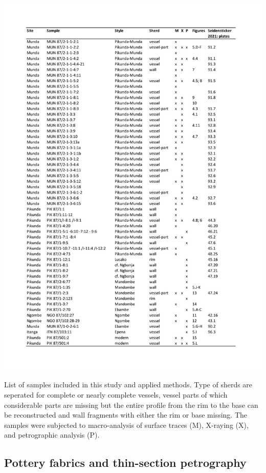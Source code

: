 \documentclass[smallextended,natbib]{svjour3}       %
\begin{document}
\begin{table}[p]
	\centering
	\includegraphics[height=.88\textheight]{Tab_Samples.pdf}
	\caption{List of samples included in this study and applied methods. Type of sherds are seperated for complete or nearly complete vessels, vessel parts of which considerable parts are missing but the entire profile from the rim to the base can be reconstructed and wall fragments with either the rim or base missing. The samples were subjected to macro-analysis of surface traces (M), X-raying (X), and petrographic analysis (P).}
	\label{tab:samples}	
\end{table}

\subsection{Pottery fabrics and thin-section petrography}
\end{document}
